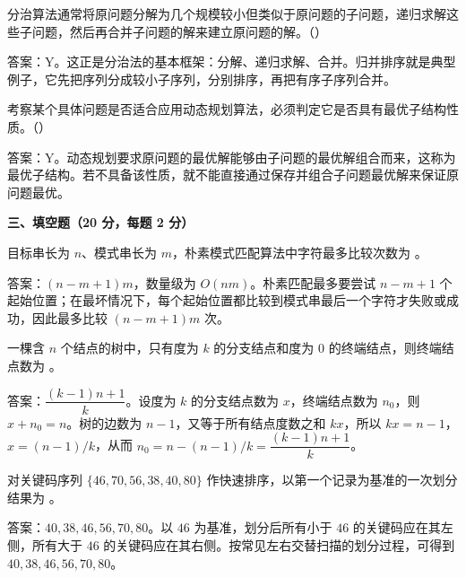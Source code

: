 \begin{question}
分治算法通常将原问题分解为几个规模较小但类似于原问题的子问题，递归求解这些子问题，然后再合并子问题的解来建立原问题的解。（\quad）
\begin{solution}
答案：Y。这正是分治法的基本框架：分解、递归求解、合并。归并排序就是典型例子，它先把序列分成较小子序列，分别排序，再把有序子序列合并。
\end{solution}
\end{question}

\begin{question}
考察某个具体问题是否适合应用动态规划算法，必须判定它是否具有最优子结构性质。（\quad）
\begin{solution}
答案：Y。动态规划要求原问题的最优解能够由子问题的最优解组合而来，这称为最优子结构。若不具备该性质，就不能直接通过保存并组合子问题最优解来保证原问题最优。
\end{solution}
\end{question}

\textbf{三、填空题（20 分，每题 2 分）}

\begin{question}
目标串长为 $n$、模式串长为 $m$，朴素模式匹配算法中字符最多比较次数为 \blank。
\begin{solution}
答案：$(n-m+1)m$，数量级为 $O(nm)$。朴素匹配最多要尝试 $n-m+1$ 个起始位置；在最坏情况下，每个起始位置都比较到模式串最后一个字符才失败或成功，因此最多比较 $(n-m+1)m$ 次。
\end{solution}
\end{question}

\begin{question}
一棵含 $n$ 个结点的树中，只有度为 $k$ 的分支结点和度为 $0$ 的终端结点，则终端结点数为 \blank。
\begin{solution}
答案：$\dfrac{(k-1)n+1}{k}$。设度为 $k$ 的分支结点数为 $x$，终端结点数为 $n_0$，则 $x+n_0=n$。树的边数为 $n-1$，又等于所有结点度数之和 $kx$，所以 $kx=n-1$，$x=(n-1)/k$，从而 $n_0=n-(n-1)/k=\dfrac{(k-1)n+1}{k}$。
\end{solution}
\end{question}

\begin{question}
对关键码序列 $\{46,70,56,38,40,80\}$ 作快速排序，以第一个记录为基准的一次划分结果为 \blank。
\begin{solution}
答案：$40,38,46,56,70,80$。以 $46$ 为基准，划分后所有小于 $46$ 的关键码应在其左侧，所有大于 $46$ 的关键码应在其右侧。按常见左右交替扫描的划分过程，可得到 $40,38,46,56,70,80$。
\end{solution}
\end{question}

